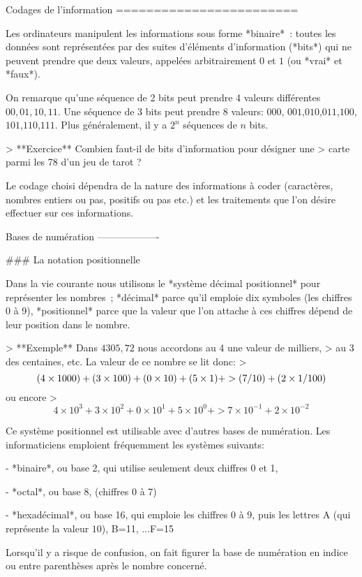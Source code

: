 Codages de l'information
========================

Les ordinateurs manipulent les informations sous forme *binaire* :
toutes les données sont représentées par des suites d'éléments
d'information (*bits*) qui ne peuvent prendre que deux valeurs, appelées
arbitrairement $0$ et $1$ (ou *vrai* et *faux*).

On remarque qu'une séquence de 2 bits peut prendre 4 valeurs différentes
$00, 01, 10, 11$. Une séquence de 3 bits peut prendre 8 valeurs: $000$,
$001$,$010$,$011$,$100$,$101$,$110$,$111$. Plus généralement, il y a
$2^n$ séquences de $n$ bits.

> **Exercice** Combien faut-il de bits d'information pour désigner une
> carte parmi les 78 d'un jeu de tarot ?

Le codage choisi dépendra de la nature des informations à coder
(caractères, nombres entiers ou pas, positifs ou pas etc.) et les
traitements que l'on désire effectuer sur ces informations.

Bases de numération
-------------------

### La notation positionnelle

Dans la vie courante nous utilisons le *système décimal positionnel*
pour représenter les nombres ; *décimal* parce qu'il emploie dix
symboles (les chiffres 0 à 9), *positionnel* parce que la valeur que
l'on attache à ces chiffres dépend de leur position dans le nombre.

> **Exemple** Dans $4305,72$ nous accordons au 4 une valeur de milliers,
> au 3 des centaines, etc. La valeur de ce nombre se lit donc:
> $$(4 \times 1000) + (3 \times 100) + (0 \times 10) + (5 \times 1) + 
> (7 \time 1/10) + (2 \times 1/100)$$ ou encore
> $$4 \times 10^3 + 3 \times 10^2 + 0 \times 10^1 + 5 \times 10^0 + 
> 7 \times 10^{-1} + 2 \times 10^{-2}$$

Ce système positionnel est utilisable avec d'autres bases de numération.
Les informaticiens emploient fréquemment les systèmes suivants:

-   *binaire*, ou base 2, qui utilise seulement deux chiffres 0 et 1,

-   *octal*, ou base 8, (chiffres 0 à 7)

-   *hexadécimal*, ou base 16, qui emploie les chiffres $0$ à $9$, puis
    les lettres A (qui représente la valeur $10$), B=11, ...F=15

Lorsqu'il y a risque de confusion, on fait figurer la base de numération
en indice ou entre parenthèses après le nombre concerné.

